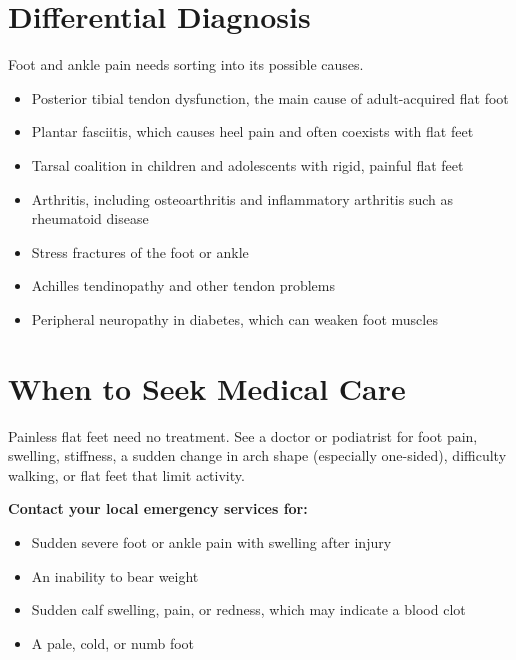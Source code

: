 \section*{Differential Diagnosis}
Foot and ankle pain needs sorting into its possible causes.
\begin{itemize}
    \item Posterior tibial tendon dysfunction, the main cause of adult-acquired flat foot
    \item Plantar fasciitis, which causes heel pain and often coexists with flat feet
    \item Tarsal coalition in children and adolescents with rigid, painful flat feet
    \item Arthritis, including osteoarthritis and inflammatory arthritis such as rheumatoid disease
    \item Stress fractures of the foot or ankle
    \item Achilles tendinopathy and other tendon problems
    \item Peripheral neuropathy in diabetes, which can weaken foot muscles
\end{itemize}

\section*{When to Seek Medical Care}
Painless flat feet need no treatment. See a doctor or podiatrist for foot pain, swelling, stiffness, a sudden change in arch shape (especially one-sided), difficulty walking, or flat feet that limit activity.

\textbf{Contact your local emergency services for:}
\begin{itemize}
    \item Sudden severe foot or ankle pain with swelling after injury
    \item An inability to bear weight
    \item Sudden calf swelling, pain, or redness, which may indicate a blood clot
    \item A pale, cold, or numb foot
\end{itemize}

